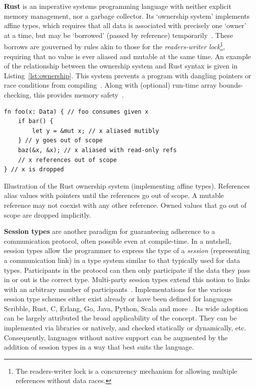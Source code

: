 \textbf{Rust} is an imperative systems programming language with neither explicit memory management, nor a garbage collector. Its `ownership system' implements affine types, which requires that all data is associated with precisely one `owner' at a time, but may be `borrowed' (passed by reference) temporarily~\cite{rustSystem}. These borrows are gouverned by rules akin to those for the \textit{readers-writer lock}\footnote{The readers-writer lock is a concurrency mechanism for allowing multiple references without data races.}, requiring that no value is ever aliased and mutable at the same time. An example of the relationship between the ownership system and Rust syntax is given in Listing~\ref{lst:ownership}. This system prevents a program with dangling pointers or race conditions from compiling~\cite{patina}. Along with (optional) run-time array bounds-checking, this provides memory safety~\cite{rustbelt,patina}.


\begin{listing}[t]
\footnotesize
\begin{verbatim}
fn foo(x: Data) { // foo consumes given x
	if bar() {
		let y = &mut x; // x aliased mutibly
	} // y goes out of scope
	baz(&x, &x); // x aliased with read-only refs
	// x references out of scope
} // x is dropped
\end{verbatim}
\caption{Illustration of the Rust ownership system (implementing affine types). References alias values with pointers until the references go out of scope. A mutable reference may not coexist with any other reference. Owned values that go out of scope are dropped implicitly.}
\label{lst:ownership}
\end{listing}

\textbf{Session types} are another paradigm for guaranteeing adherence to a communication protocol, often possible even at compile-time. In a nutshell, session types allow the programmer to express the type of a \textit{session} (representing a communication link) in a type system similar to that typically used for data types. Participants in the protocol can then only participate if the data they pass in or out is the correct type. Multi-party session types extend this notion to links with an arbitrary number of participants~\cite{sessionMultiparty}. Implementations for the various session type schemes either exist already or have been defined for languages Scribble, Rust, C, Erlang, Go, Java, Python, Scala and more~\cite{sessionRust,sessionHaskell}. Its wide adoption can be largely attributed the broad applicability of the concept. They can be implemented via libraries or natively, and checked statically or dynamically, etc. Consequently, languages without native support can be augmented by the addition of session types in a way that best suits the language.

